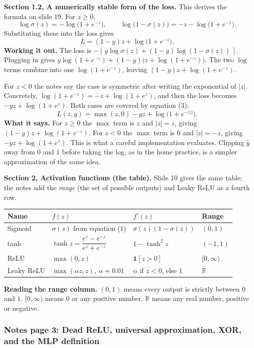 \textbf{Section 1.2, A numerically stable form of the loss.} This derives the formula on slide 19. For $z\ge0$,
\[
\log\sigma(z)=-\log\big(1+e^{-z}\big), \qquad \log\big(1-\sigma(z)\big)=-z-\log\big(1+e^{-z}\big).
\]
Substituting these into the loss gives
\[
L=(1-y)z+\log\big(1+e^{-z}\big).
\]
\textbf{Working it out.} The loss is $-[\,y\log\sigma(z)+(1-y)\log(1-\sigma(z))\,]$. Plugging in gives $y\log(1+e^{-z})+(1-y)\big(z+\log(1+e^{-z})\big)$. The two $\log$ terms combine into one $\log(1+e^{-z})$, leaving $(1-y)z+\log(1+e^{-z})$.

For $z<0$ the notes say the case is symmetric after writing the exponential of $|z|$. Concretely, $\log(1+e^{-z})=-z+\log(1+e^{z})$, and then the loss becomes $-yz+\log(1+e^{z})$. Both cases are covered by equation (3):
\[
L(z,y)=\max(z,0)-yz+\log\!\big(1+e^{-|z|}\big).
\]
\textbf{What it says.} For $z\ge0$ the $\max$ term is $z$ and $|z|=z$, giving $(1-y)z+\log(1+e^{-z})$. For $z<0$ the $\max$ term is $0$ and $|z|=-z$, giving $-yz+\log(1+e^{z})$. This is what a careful implementation evaluates. Clipping $\hat{y}$ away from $0$ and $1$ before taking the log, as in the home practice, is a simpler approximation of the same idea.

\textbf{Section 2, Activation functions (the table).} Slide 10 gives the same table; the notes add the \emph{range} (the set of possible outputs) and Leaky ReLU as a fourth row.

\begin{center}
\begin{tabular}{p{2.3cm}p{4.0cm}p{3.6cm}p{2.0cm}}
\toprule
Name & $f(z)$ & $f'(z)$ & Range \\
\midrule
Sigmoid & $\sigma(z)$ from equation (1) & $\sigma(z)(1-\sigma(z))$ & $(0,1)$ \\[0.4em]
tanh & $\tanh z=\dfrac{e^{z}-e^{-z}}{e^{z}+e^{-z}}$ & $1-\tanh^2z$ & $(-1,1)$ \\[0.7em]
ReLU & $\max(0,z)$ & $\mathbf{1}[z>0]$ & $[0,\infty)$ \\[0.4em]
Leaky ReLU & $\max(\alpha z,z)$, $\alpha=0.01$ & $\alpha$ if $z<0$, else $1$ & $\mathbb{R}$ \\
\bottomrule
\end{tabular}
\end{center}
\textbf{Reading the range column.} $(0,1)$ means every output is strictly between $0$ and $1$. $[0,\infty)$ means $0$ or any positive number. $\mathbb{R}$ means any real number, positive or negative.

\subsubsection{Notes page 3: Dead ReLU, universal approximation, XOR, and the MLP definition}


